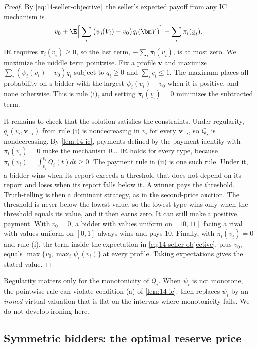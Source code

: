 \begin{proof}
By \eqref{eq:14-seller-objective}, the seller's expected payoff from any IC mechanism is
\[
v_0+\E\Big[\sum_i\big(\psi_i(V_i)-v_0\big)q_i(\bm V)\Big]-\sum_i\pi_i(\underline v_i).
\]
 IR requires $\pi_i(\underline v_i)\ge 0$, so the last term, $-\sum_i\pi_i(\underline v_i)$, is at most zero. We maximize the middle term pointwise. Fix a profile $\bm v$ and maximize $\sum_i(\psi_i(v_i)-v_0)q_i$ subject to $q_i\ge 0$ and $\sum_iq_i\le 1$. The maximum places all probability on a bidder with the largest $\psi_i(v_i)-v_0$ when it is positive, and none otherwise. This is rule (i), and setting $\pi_i(\underline v_i)=0$ minimizes the subtracted term.

It remains to check that the solution satisfies the constraints. Under regularity, $q_i(v_i,\bm v_{-i})$ from rule (i) is nondecreasing in $v_i$ for every $\bm v_{-i}$, so $Q_i$ is nondecreasing. By \cref{lem:14-ic}, payments defined by the payment identity with $\pi_i(\underline v_i)=0$ make the mechanism IC. IR holds for every type, because $\pi_i(v_i)=\int_{\underline v_i}^{v_i}Q_i(t)dt\ge 0$. The payment rule in (ii) is one such rule. Under it, a bidder wins when its report exceeds a threshold that does not depend on its report and loses when its report falls below it. A winner pays the threshold. Truth-telling is then a dominant strategy, as in the second-price auction. The threshold is never below the lowest value, so the lowest type wins only when the threshold equals its value, and it then earns zero. It can still make a positive payment. With $v_0=0$, a bidder with values uniform on $[10,11]$ facing a rival with values uniform on $[0,1]$ always wins and pays $10$. Finally, with $\pi_i(\underline v_i)=0$ and rule (i), the term inside the expectation in \eqref{eq:14-seller-objective}, plus $v_0$, equals $\max\{v_0,\max_i\psi_i(v_i)\}$ at every profile. Taking expectations gives the stated value.
\end{proof}

Regularity matters only for the monotonicity of $Q_i$. When $\psi_i$ is not monotone, the pointwise rule can violate condition (a) of \cref{lem:14-ic}.  then replaces $\psi_i$ by an \emph{ironed} virtual valuation that is flat on the intervals where monotonicity fails. We do not develop ironing here.

\subsection{Symmetric bidders: the optimal reserve price}\label{sec:14-optimal-reserve}

